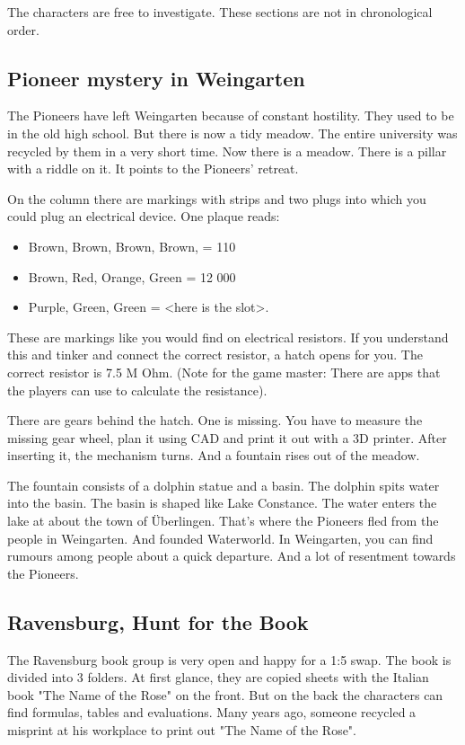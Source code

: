 The characters are free to investigate. These sections are not in chronological order.

\subsection{Pioneer mystery in Weingarten}

The Pioneers have left Weingarten because of constant hostility. They used to be in the old high school. But there is now a tidy meadow. The entire university was recycled by them in a very short time. Now there is a meadow.
There is a pillar with a riddle on it. It points to the Pioneers' retreat.

On the column there are markings with strips and two plugs into which you could plug an electrical device. One plaque reads:

\begin{itemize}
    \item Brown, Brown, Brown, Brown, = 110
    \item Brown, Red, Orange, Green = 12 000
    \item Purple, Green, Green = <here is the slot>.
\end{itemize}

These are markings like you would find on electrical resistors. If you understand this and tinker and connect the correct resistor, a hatch opens for you. The correct resistor is 7.5 M Ohm.
(Note for the game master: There are apps that the players can use to calculate the resistance).

There are gears behind the hatch. One is missing.
You have to measure the missing gear wheel, plan it using CAD and print it out with a 3D printer. After inserting it, the mechanism turns. And a fountain rises out of the meadow.

The fountain consists of a dolphin statue and a basin.
The dolphin spits water into the basin. The basin is shaped like Lake Constance. The water enters the lake at about the town of Überlingen.
That's where the Pioneers fled from the people in Weingarten. And founded Waterworld.
In Weingarten, you can find rumours among people about a quick departure. And a lot of resentment towards the Pioneers.

\subsection{Ravensburg, Hunt for the Book}

The Ravensburg book group is very open and happy for a 1:5 swap. The book is divided into 3 folders. At first glance, they are copied sheets with the Italian book "The Name of the Rose" on the front. But on the back the characters can find formulas, tables and evaluations. Many years ago, someone recycled a misprint at his workplace to print out "The Name of the Rose".

